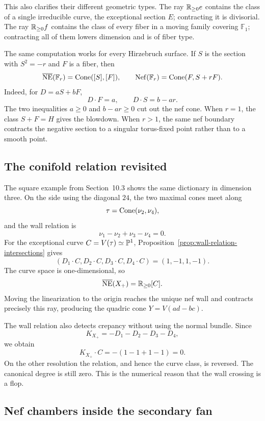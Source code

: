 This also clarifies their different geometric types.  The ray
\(\mathbb{R}_{\geq0}e\) contains the class of a single irreducible curve,
the exceptional section \(E\); contracting it is divisorial.  The ray
\(\mathbb{R}_{\geq0}f\) contains the class of every fiber in a moving family
covering \(\mathbb F_1\); contracting all of them lowers dimension and
is of fiber type.

\begin{surfacelaboratory}
The same computation works for every Hirzebruch surface.  If \(S\) is
the section with \(S^2=-r\) and \(F\) is a fiber, then
\[
\overline{\operatorname{NE}}(\mathbb F_r)=\operatorname{Cone}([S],[F]),
\qquad
\operatorname{Nef}(\mathbb F_r)=\operatorname{Cone}(F,S+rF).
\]
Indeed, for \(D=aS+bF\),
\[
D\cdot F=a,
\qquad
D\cdot S=b-ar.
\]
The two inequalities \(a\geq0\) and \(b-ar\geq0\) cut out the nef
cone.  When \(r=1\), the class \(S+F=H\) gives the blowdown.  When
\(r>1\), the same nef boundary contracts the negative section to a
singular torus-fixed point rather than to a smooth point.
\end{surfacelaboratory}

\subsection{The conifold relation revisited}

The square example from Section~10.3 shows the same dictionary in
dimension three.  On the side using the diagonal \(24\), the two
maximal cones meet along
\[
\tau=\operatorname{Cone}(\nu_2,\nu_4),
\]
and the wall relation is
\[
\nu_1-\nu_2+\nu_3-\nu_4=0.
\]
For the exceptional curve \(C=V(\tau)\simeq\mathbb{P}^1\),
Proposition~\ref{prop:wall-relation-intersections} gives
\[
(D_1\cdot C,D_2\cdot C,D_3\cdot C,D_4\cdot C)
=(1,-1,1,-1).
\]
The curve space is one-dimensional, so
\[
\overline{\operatorname{NE}}(X_+)=\mathbb{R}_{\geq0}[C].
\]
Moving the linearization to the origin reaches the unique nef wall and
contracts precisely this ray, producing the quadric cone
\(Y=V(ad-bc)\).

The wall relation also detects crepancy without using the normal bundle.
Since
\[
K_{X_+}=-D_1-D_2-D_3-D_4,
\]
we obtain
\[
K_{X_+}\cdot C
=
-(1-1+1-1)
=0.
\]
On the other resolution the relation, and hence the curve class, is
reversed.  The canonical degree is still zero.  This is the numerical
reason that the wall crossing is a flop.

\subsection{Nef chambers inside the secondary fan}

